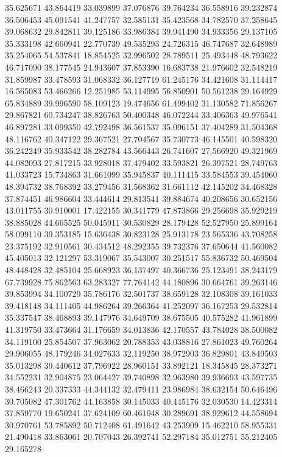 35.625671
43.864419
33.039899
37.076876
39.764234
36.558916
39.232874
36.506453
45.091541
41.247757
32.585131
35.423568
34.782570
37.258645
39.068632
29.842811
39.125186
33.986384
39.941490
34.933356
29.137105
35.333198
42.660941
22.770739
49.535293
24.726315
46.747687
32.648989
35.254065
54.537841
18.854525
32.996502
28.789511
25.493448
48.793622
46.717090
38.177545
24.943607
37.853390
16.683738
21.976602
32.548219
31.859987
33.478593
31.068332
36.127719
61.245176
34.421608
31.114417
16.565083
53.466266
12.251985
53.114995
56.850901
50.561238
29.164929
65.834889
39.996590
58.109123
19.474656
61.499402
31.130582
71.856267
29.867821
60.734247
38.826763
50.400348
46.072244
33.406363
49.976541
46.897281
33.099350
42.792498
36.561537
35.096151
37.404289
31.504368
48.116762
40.347122
29.367521
27.704567
35.730773
46.145501
40.598320
36.242249
35.933542
38.282784
43.566443
26.741607
27.566920
49.321969
44.082093
27.817215
33.928018
37.479402
33.593821
26.397521
28.749763
41.033723
15.734863
31.661099
35.945837
40.111415
33.584553
39.454060
48.394732
38.768392
33.279456
31.568362
31.661112
42.145202
34.468328
37.874451
46.986604
33.444614
29.813541
39.884674
40.208656
30.652156
43.011755
30.910001
17.422155
30.341779
47.873866
29.256698
35.929219
38.885028
44.665525
50.045911
30.530829
28.179428
52.527950
25.899164
58.099110
39.353185
15.636438
30.823128
25.913178
23.565336
43.708258
23.375192
32.910561
30.434512
48.292355
39.732376
37.650644
41.560082
45.405013
32.121297
53.319067
35.543007
30.251517
55.836732
50.469504
48.448428
32.485104
25.668923
36.137497
40.366736
25.123491
38.243179
67.739928
75.862563
63.283327
77.764142
44.180896
30.664761
39.263146
39.853994
34.100729
35.786176
32.501737
38.659128
32.108308
39.161033
39.418148
34.111405
44.986264
39.266364
41.252097
36.167253
29.532814
35.337547
38.468893
39.147976
34.649709
38.675505
40.575282
41.961899
41.319750
33.473664
31.176659
34.013836
42.170557
43.784028
38.500082
34.119100
25.854507
37.963062
20.788353
43.038816
27.861023
49.760264
29.906055
48.179246
34.027633
32.119250
38.972903
36.829801
43.849503
35.013298
39.440612
37.796922
28.960151
33.892121
18.345845
28.373271
34.552231
32.904875
23.064427
39.740898
32.963980
39.936693
43.597735
38.466243
20.337333
44.344132
32.479411
23.986984
38.632154
50.646496
30.705082
47.301762
44.163858
30.145033
40.445176
32.030530
14.423314
37.859770
19.650241
37.624109
60.461048
30.289691
38.929612
44.558694
30.970761
53.785892
50.712408
61.491642
43.253909
15.462210
58.955331
21.490418
33.863061
20.707043
26.392741
52.297184
35.012751
55.212405
29.165278

